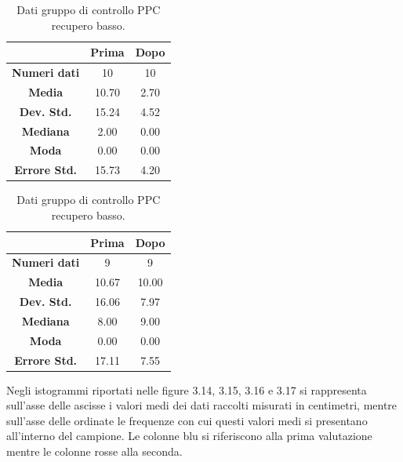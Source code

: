 \begin{table}
\begin{minipage}{0.48\textwidth}
\begin{tabular}{|c|c|c|} \hline
{\textbf{}} & {\textbf{  \hspace{8pt}Prima\hspace{8pt} }} & {\textbf{ \hspace{8pt}Dopo\hspace{8pt}  }}\\ \hline
\textbf{Numeri dati} & 10 & 10 \\
\textbf{Media} & 10.70 & 2.70 \\  
\textbf{Dev. Std.} & 15.24 & 4.52 \\ 
\textbf{Mediana} & 2.00 & 0.00 \\ 
\textbf{Moda} & 0.00 & 0.00 \\ 
\textbf{Errore Std.}& 15.73 & 4.20 \\ 
\hline
\end{tabular}
\caption{Dati gruppo sperimentale PPC recupero basso.}

\label{tab:accuracy} 
\end{minipage}%
\hfill
\begin{minipage}{0.48\textwidth}
\centering

\begin{tabular}{|c|c|c|} \hline
{\textbf{}} & {\textbf{  \hspace{8pt}Prima\hspace{8pt} }} & {\textbf{ \hspace{8pt}Dopo\hspace{8pt}  }}\\ \hline
\textbf{Numeri dati} & 9 & 9 \\ 
\textbf{Media} & 10.67 & 10.00 \\  
\textbf{Dev. Std.} & 16.06 & 7.97 \\  
\textbf{Mediana} & 8.00 & 9.00 \\ 
\textbf{Moda} & 0.00 & 0.00 \\ 
\textbf{Errore Std.} & 17.11 & 7.55\\ 
\hline
\end{tabular}
\caption{Dati gruppo di controllo PPC recupero basso.}

 \label{tab:ompdiff} 
\end{minipage}
\end{table}

Negli istogrammi riportati nelle figure 3.14, 3.15, 3.16 e 3.17 si rappresenta sull’asse delle ascisse i valori medi dei dati raccolti misurati in centimetri, mentre sull’asse delle ordinate le frequenze con cui questi valori medi si presentano all’interno del campione. Le colonne blu si riferiscono alla prima valutazione mentre le colonne rosse alla seconda.

